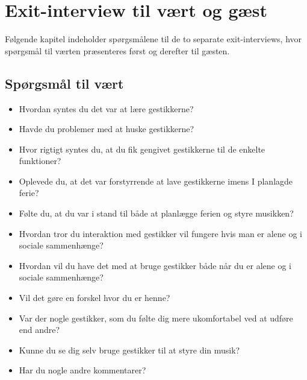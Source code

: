 \chapter{Exit-interview til vært og gæst}
\label{app:ExitInterviewSocialAccept}
%
Følgende kapitel indeholder spørgsmålene til de to separate exit-interviews, hvor spørgsmål til værten præsenteres først og derefter til gæsten. \blankline
%
\section{Spørgsmål til vært}
\label{app:ExitInterviewVaert}
%
\begin{itemize}
  \item Hvordan syntes du det var at lære gestikkerne?
  \item Havde du problemer med at huske gestikkerne?
  \item Hvor rigtigt syntes du, at du fik gengivet gestikkerne til de enkelte funktioner? 
  \item Oplevede du, at det var forstyrrende at lave gestikkerne imens I planlagde ferie? 
  \item Følte du, at du var i stand til både at planlægge ferien og styre musikken?
  \item Hvordan tror du interaktion med gestikker vil fungere hvis man er alene og i sociale sammenhænge?
  \item Hvordan vil du have det med at bruge gestikker både når du er alene og i sociale sammenhænge? 
  \item Vil det gøre en forskel hvor du er henne?
  \item Var der nogle gestikker, som du følte dig mere ukomfortabel ved at udføre end andre? 
  \item Kunne du se dig selv bruge gestikker til at styre din musik? 
  \item Har du nogle andre kommentarer? 
\end{itemize}
%
